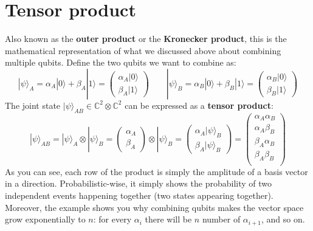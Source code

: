 \section{Tensor product}
Also known as the \textbf{outer product} or the \textbf{Kronecker product}, this is the mathematical representation of what we discussed above about combining multiple qubits. Define the two qubits we want to combine as:
\begin{equation}
    |\psi\rangle_A 
        = \alpha_A|0\rangle + \beta_A|1\rangle
        = \begin{pmatrix}
            \alpha_A|0\rangle \\ \beta_A|1\rangle
        \end{pmatrix}
    \qquad
    |\psi\rangle_B 
        = \alpha_B|0\rangle + \beta_B|1\rangle
        = \begin{pmatrix}
            \alpha_B|0\rangle \\ \beta_B|1\rangle
        \end{pmatrix}
\end{equation}
The joint state $|\psi\rangle_{AB} \in \mathbb{C}^2\otimes\mathbb{C}^2$ can be expressed as a \textbf{tensor product}:
\begin{equation}
    \label{eq:p2}
    |\psi\rangle_{AB}
    = |\psi\rangle_A \otimes |\psi\rangle_B
    = \begin{pmatrix}
        \alpha_A \\ \beta_A
    \end{pmatrix} \otimes |\psi\rangle_B
    = \begin{pmatrix}
        \alpha_A|\psi\rangle_B \\ \beta_A|\psi\rangle_B
    \end{pmatrix}
    = \begin{pmatrix}
        \alpha_A\alpha_B \\
        \alpha_A\beta_B \\
        \beta_A\alpha_B \\
        \beta_A\beta_B \\
    \end{pmatrix}
\end{equation}
As you can see, each row of the product is simply the amplitude of a basis vector in a direction. Probabilistic-wise, it simply shows the probability of two independent events happening together (two states appearing together). Moreover, the example shows you why combining qubits makes the vector space grow exponentially to $n$: for every $\alpha_i$ there will be $n$ number of $\alpha_{i+1}$, and so on.

